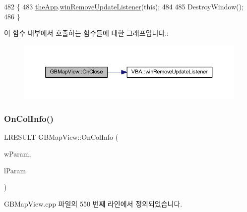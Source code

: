 \begin{DoxyCode}
482 \{
483   \mbox{\hyperlink{_v_b_a_8cpp_a8095a9d06b37a7efe3723f3218ad8fb3}{theApp}}.\mbox{\hyperlink{class_v_b_a_a2d31a0656df2230310aa8dc9e3a735d3}{winRemoveUpdateListener}}(\textcolor{keyword}{this});
484   
485   DestroyWindow();
486 \}
\end{DoxyCode}
이 함수 내부에서 호출하는 함수들에 대한 그래프입니다.\+:
\nopagebreak
\begin{figure}[H]
\begin{center}
\leavevmode
\includegraphics[width=350pt]{class_g_b_map_view_a71cb2125ab0c6216749d128c16d37bff_cgraph}
\end{center}
\end{figure}
\mbox{\label{class_g_b_map_view_a6a6842be36789566f8fc918ded572bbe}} 
\subsubsection{\texorpdfstring{On\+Col\+Info()}{OnColInfo()}}
{\footnotesize\ttfamily L\+R\+E\+S\+U\+LT G\+B\+Map\+View\+::\+On\+Col\+Info (\begin{DoxyParamCaption}\item[{W\+P\+A\+R\+AM}]{w\+Param,  }\item[{L\+P\+A\+R\+AM}]{l\+Param }\end{DoxyParamCaption})}



G\+B\+Map\+View.\+cpp 파일의 550 번째 라인에서 정의되었습니다.


